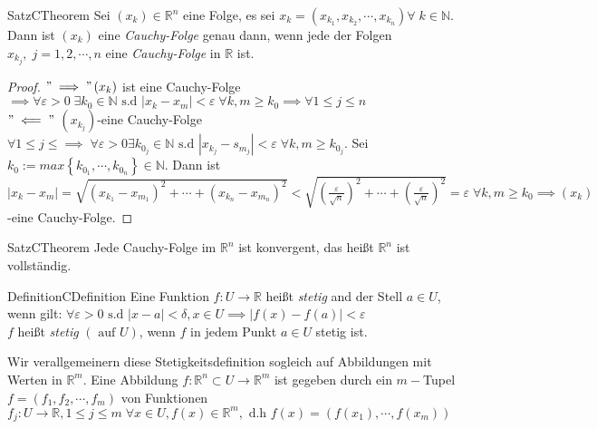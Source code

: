 \documentclass[11.5 pt, a4paper]{memoir}
\begin{document}
\begin{ibox}[12]{Satz}{CTheorem}
    Sei $ \left( x_k \right) \in \mathbb{R}^n $ eine Folge, es sei $ x_k = \left( x_{k_{1}}, x_{k_{2}},\cdots, x_{k_{n}} \right) \forall \;
	k \in \mathbb{N}$. Dann ist $ \left( x_k \right)  $ eine \textit{Cauchy-Folge} genau dann, wenn jede der Folgen $ x_{k_{j}}, \; j = 1,2
	, \cdots ,n$ eine \textit{Cauchy-Folge} in $ \mathbb{R} $ ist.
\end{ibox}
\begin{proof}
	$ " \implies" \left( x_k \right)  $ ist eine Cauchy-Folge $ \implies \forall \varepsilon > 0 \; \exists k_0 \in \mathbb{N} \text{ s.d } 
	\left| x_k - x_m \right| < \varepsilon \; \forall k,m \geq k_0  \implies \forall  1 \leq j \leq n $  \\
	$ " \impliedby" $ $ \left( x_{k_{j}} \right)  $-eine Cauchy-Folge	$ \forall 1  \leq j \leq \implies \; \forall \varepsilon > 0
	\exists k_{0_{j}} \in \mathbb{N} \text{ s.d } \left| x_{k_{j}} - s_{m_{j}} \right| < \varepsilon \; \forall k,m \geq k_{0_{j}}$.
	Sei $ k_0 := max \left\{ k_{0_{1}}, \cdots, k_{0_{n}} \right\} \in \mathbb{N} $. Dann ist $ \left| x_k - x_m \right| = \sqrt{
	\left( x_{k_1} - x_{m_1} \right)^{2} + \cdots + \left( x_{k_n} - x_{m_n} \right)^{2}} <  
	\sqrt{\left( \frac{ \varepsilon}{\sqrt{n}} \right)^2 + \cdots +  \left( \frac{ \varepsilon}{\sqrt{n}} \right)^2} = \varepsilon \;
	\forall k, m \geq k_0 \implies \left( x_k \right)$-eine Cauchy-Folge.
\end{proof}

\begin{ibox}[13]{Satz}{CTheorem}
    Jede Cauchy-Folge im $ \mathbb{R}^n  $ ist konvergent, das heißt $ \mathbb{R}^n  $ ist vollständig.
\end{ibox}


\begin{ibox}[]{Definition}{CDefinition}
    Eine Funktion $ f: U \to \mathbb{R}  $ heißt \textit{stetig} and der Stell $ a \in  U $, wenn gilt: $ \forall  \varepsilon >0 
	\text{ s.d } \left| x-a \right| < \delta, x \in  U \implies \left| f(x)-f(a) \right| < \varepsilon $\\
	$ f $ heißt \textit{stetig} $ \left( \text{ auf } U \right)  $, wenn $ f $ in jedem Punkt $ a \in  U $ stetig ist.
\end{ibox}
Wir verallgemeinern diese Stetigkeitsdefinition sogleich auf Abbildungen mit Werten in $ \mathbb{R}^m $. Eine Abbildung $ f : \mathbb{R}^n 
\subset U \to \mathbb{R}^m  $ ist gegeben durch ein $ m- $Tupel $ f = (f_1,f_2,\cdots, f_m) $ von Funktionen $ f_{j}: U \to \mathbb{R} 
, 1 \leq  j \leq m \; \forall  x \in  U, f(x) \in  \mathbb{R}^m, \text{ d.h } f(x) = \left( f(x_1), \cdots, f(x_m) \right) $ 
\end{document}
